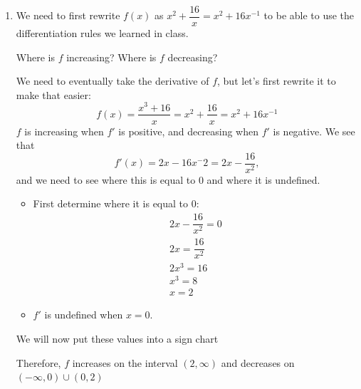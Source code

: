 \documentclass{article}
\begin{document}
\begin{enumerate}
\begin{enumerate}
\begin{solution}
    \end{solution}

  \item

    \begin{workshop}
      We need to first rewrite $f(x)$ as $x^2 + \dfrac{16}{x} = x^2 + 16 x^{-1}$ to be able to use the differentiation rules we learned in class.
    \end{workshop}

    \begin{problem}[\vfill]
      Where is $f$ increasing? Where is $f$ decreasing?
    \end{problem}

    \begin{solution}
        We need to eventually take the derivative of $f$, but let's first rewrite it to make that easier:
        $$f(x) = \dfrac{x^3+16}{x} = x^2 + \dfrac{16}{x} = x^2 + 16x^{-1}$$
        $f$ is increasing when $f'$ is positive, and decreasing when $f'$ is negative. We see that 
        $$f'(x) = 2x - 16x^-2 = 2x - \dfrac{16}{x^2},$$
        and we need to see where this is equal to 0 and where it is undefined.
        \begin{itemize}
            \item First determine where it is equal to 0:
            \begin{align*}
                2x-\dfrac{16}{x^2} = 0 \\
                2x = \dfrac{16}{x^2} \\
                2x^3 = 16 \\
                x^3  = 8 \\
                x = 2
            \end{align*}
            \item $f'$ is undefined when $x = 0$. 
        \end{itemize}
        We will now put these values into a sign chart 

        \begin{center}
      \end{center}
      Therefore, $f$ increases on the interval $(2, \infty)$ and decreases on $(-\infty, 0) \cup (0,2)$
    \end{solution}


\end{enumerate}
\end{enumerate}
\end{document}
